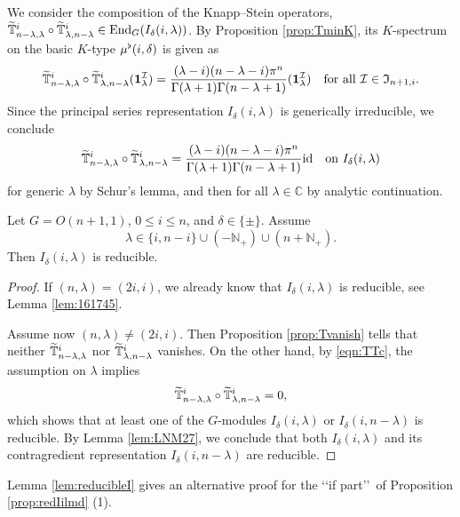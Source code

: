 We consider the composition of the Knapp--Stein operators,
 $\widetilde{{\mathbb{T}}}_{{n-\lambda},{\lambda}}^{{i}} \circ \widetilde{{\mathbb{T}}}_{{\lambda},{n-\lambda}}^{{i}}
\in {\operatorname{End}}_{G} (I_{\delta}(i,\lambda))$.  
By Proposition \ref{prop:TminK}, 
 its $K$-spectrum on the basic $K$-type
 $\mu^{\flat} (i,\delta)$ is given as 
\[
   \widetilde{{\mathbb{T}}}_{{n-\lambda},{\lambda}}^{{i}} \circ \widetilde{{\mathbb{T}}}_{{\lambda},{n-\lambda}}^{{i}}
   ({\bf{1}}_{\lambda}^{\mathcal{I}})
   =
   \frac{(\lambda-i)(n-\lambda-i) \pi^n}
        {\Gamma(\lambda+1)\Gamma(n-\lambda+1)}
        ({\bf{1}}_{\lambda}^{\mathcal{I}})
\quad
\text{for all ${\mathcal{I}} \in {\mathfrak{I}}_{n+1,i}$}.  
\]
Since the principal series representation $I_{\delta}(i,\lambda)$
 is generically irreducible,
 we conclude
\begin{equation}
\label{eqn:TTc}
\widetilde{{\mathbb{T}}}_{{n-\lambda},{\lambda}}^{{i}} \circ \widetilde{{\mathbb{T}}}_{{\lambda},{n-\lambda}}^{{i}}
  = 
  \frac{(\lambda-i)(n-\lambda-i) \pi^n}
        {\Gamma(\lambda+1)\Gamma(n-\lambda+1)}
  {\operatorname{id}}
\quad
\text{on $I_{\delta}(i,\lambda)$}
\end{equation}
 for generic $\lambda$ by Schur's lemma, 
 and then for all $\lambda \in {\mathbb{C}}$
 by analytic continuation.  



\begin{lemma}
\label{lem:reducibleI}
Let $G=O(n+1,1)$, 
 $0 \le i \le n$, 
 and $\delta \in \{\pm\}$.  
Assume
\[
   \lambda \in \{i,n-i\} \cup (-{\mathbb{N}}_+) \cup (n + {\mathbb{N}}_+).  
\]
Then $I_{\delta}(i,\lambda)$ is reducible.  
\end{lemma}
\begin{proof}
If $(n,\lambda) = (2i,i)$, 
 we already know 
 that $I_{\delta}(i,\lambda)$ is reducible,
 see Lemma \ref{lem:161745}.  

Assume now $(n,\lambda) \ne (2i,i)$.  
Then Proposition \ref{prop:Tvanish} tells 
 that neither $\widetilde{{\mathbb{T}}}_{{n-\lambda},{\lambda}}^{{i}}$
 nor $\widetilde{{\mathbb{T}}}_{{\lambda},{n-\lambda}}^{{i}}$ vanishes.  
On the other hand, 
 by \eqref{eqn:TTc}, 
 the assumption on $\lambda$ implies 
\[
   \widetilde{{\mathbb{T}}}_{{n-\lambda},{\lambda}}^{{i}} \circ \widetilde{{\mathbb{T}}}_{{\lambda},{n-\lambda}}^{{i}} =0, 
\]
which shows that at least one of the $G$-modules $I_{\delta}(i,\lambda)$
 or $I_{\delta}(i,n-\lambda)$ is reducible.  
By Lemma \ref{lem:LNM27}, 
 we conclude 
 that both $I_{\delta}(i,\lambda)$
 and its contragredient representation $I_{\delta}(i,n-\lambda)$
 are reducible.  
\end{proof}
Lemma \ref{lem:reducibleI} gives an alternative proof 
 for the \lq\lq{if part}\rq\rq\
 of Proposition \ref{prop:redIilmd} (1).  



